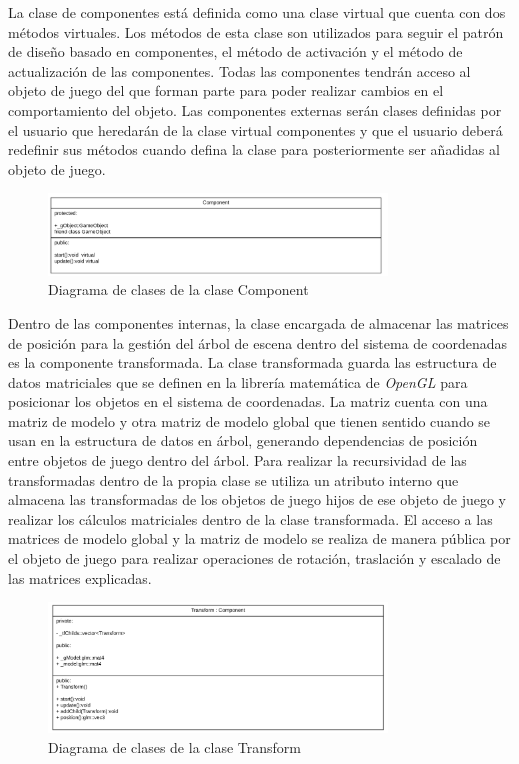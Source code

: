 \documentclass[a4paper]{book}
\begin{document}
La clase de componentes está definida como una clase virtual que cuenta con dos métodos virtuales. Los métodos de esta clase son utilizados
para seguir el patrón de diseño basado en componentes, el método de activación y el método de actualización de las componentes. Todas
las componentes tendrán acceso al objeto de juego del que forman parte para poder realizar cambios en el comportamiento del objeto. Las
componentes externas serán clases definidas por el usuario que heredarán de la clase virtual componentes y que el usuario deberá
redefinir sus métodos cuando defina la clase para posteriormente ser añadidas al objeto de juego.

\begin{figure}[H]
    \centering
    \includegraphics[width=9cm, keepaspectratio]{img/Component.png}
    \caption{Diagrama de clases de la clase Component}
    \label{Component}
\end{figure}

Dentro de las componentes internas, la clase encargada de almacenar las matrices de posición para la gestión del árbol de escena dentro
del sistema de coordenadas es la componente transformada. La clase transformada guarda las estructura de datos matriciales que se definen
en la librería matemática de \textit{OpenGL} para posicionar los objetos en el sistema de coordenadas. La matriz cuenta con una matriz
de modelo y otra matriz de modelo global que tienen sentido cuando se usan en la estructura de datos en árbol, generando dependencias de
posición entre objetos de juego dentro del árbol. Para realizar la recursividad de las transformadas dentro de la propia clase se utiliza
un atributo interno que almacena las transformadas de los objetos de juego hijos de ese objeto de juego y realizar los cálculos matriciales
dentro de la clase transformada. El acceso a las matrices de modelo global y la matriz de modelo se realiza de manera pública por el objeto
de juego para realizar operaciones de rotación, traslación y escalado de las matrices explicadas.

\begin{figure}[H]
    \centering
    \includegraphics[width=9cm, keepaspectratio]{img/Transform.png}
    \caption{Diagrama de clases de la clase Transform}
    \label{Transform}
\end{figure}
\end{document}
